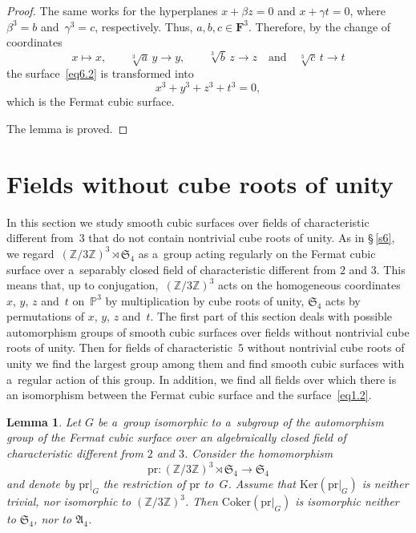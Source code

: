 \documentclass{amsart}
\numberwithin{equation}{section}
\theoremstyle{plain}
\newtheorem{lemma}{Lemma}
\theoremstyle{definition}
\theoremstyle{remark}
\begin{document}
\begin{proof}
The same works for the hyperplanes $x+\beta z=0$ and $x+\gamma t=0$, where $\beta^3=b$ and~\mbox{$\gamma^3=c$,} respectively. Thus, $a,b,c \in \mathbf{F}^3$. Therefore, by the change of coordinates
$$
x \mapsto x,\qquad \sqrt[3]{a}\, y \to y,\qquad \sqrt[3]{b}\, z \to z \quad\text{and}\quad \sqrt[3]{c}\, t \to t
$$
the surface~\eqref{eq6.2} is transformed into
$$
x^3+y^3+z^3+t^3=0,
$$
which is the Fermat cubic surface.

The lemma is proved.
\end{proof}


\section{Fields without cube roots of unity}
\label{s7}

In this section we study smooth cubic surfaces over fields of characteristic different from~$3$ that do not contain nontrivial cube roots of unity. As in \S\,\ref{s6}, we regard~\mbox{$(\mathbb{Z}/3\mathbb{Z})^3 \rtimes \mathfrak{S}_4$} as a~group acting regularly 
 on the Fermat cubic surface over a~separably closed field of characteristic different from $2$ and $3$. This means that, up to conjugation,~$(\mathbb{Z}/3\mathbb{Z})^3$ acts on the homogeneous coordinates $x$, $y$, $z$ and~$t$ on~$\mathbb{P}^3$ by multiplication by cube roots of unity, $\mathfrak{S}_4$ acts by permutations of $x$, $y$, $z$ and~$t$. The first part of this section deals with possible automorphism groups of smooth cubic surfaces over fields without nontrivial cube roots of unity. Then for fields of characteristic~$5$ without nontrivial cube roots of unity we find the largest group among them and find smooth cubic surfaces with a~regular action of this group. In addition, we find all fields over which there is an isomorphism between the Fermat cubic surface and the surface~\eqref{eq1.2}.

\begin{lemma}
\label{l45}
Let $G$ be a~group isomorphic to a~subgroup of the automorphism group of the Fermat cubic surface over an algebraically closed field of characteristic different from $2$ and $3$. Consider the homomorphism
$$
\mathrm{pr} \colon (\mathbb{Z}/3\mathbb{Z})^3 \rtimes \mathfrak{S}_4 \to \mathfrak{S}_4
$$
and denote by $\mathrm{pr} |_G$ the restriction of $\mathrm{pr}$ to~$G$. Assume that $\mathrm{Ker}(\mathrm{pr} |_G)$ is neither trivial, nor isomorphic to $(\mathbb{Z}/3\mathbb{Z})^3$. Then $\mathrm{Coker}(\mathrm{pr} |_G)$ is isomorphic neither to $\mathfrak{S}_4$, nor to $\mathfrak{A}_4$.
\end{lemma}
\end{document}
